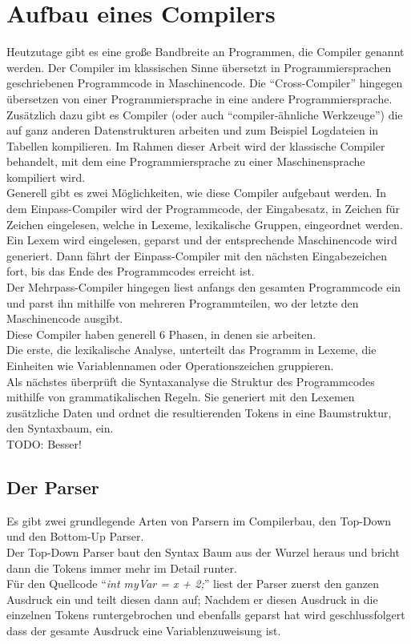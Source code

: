 \section{Aufbau eines Compilers}

Heutzutage gibt es eine große Bandbreite an Programmen, die Compiler genannt werden.
Der Compiler im klassischen Sinne übersetzt in Programmiersprachen geschriebenen Programmcode in Maschinencode.
Die ``Cross-Compiler'' hingegen übersetzen von einer Programmiersprache in eine andere Programmiersprache.
Zusätzlich dazu gibt es Compiler (oder auch ``compiler-ähnliche Werkzeuge'') die auf ganz anderen Datenstrukturen arbeiten und zum Beispiel Logdateien in Tabellen kompilieren.
Im Rahmen dieser Arbeit wird der klassische Compiler behandelt, mit dem eine Programmiersprache zu einer Maschinensprache kompiliert wird.\\
Generell gibt es zwei Möglichkeiten, wie diese Compiler aufgebaut werden.
In dem Einpass-Compiler wird der Programmcode, der Eingabesatz, in Zeichen für Zeichen eingelesen, welche in Lexeme, lexikalische Gruppen, eingeordnet werden.
Ein Lexem wird eingelesen, geparst und der entsprechende Maschinencode wird generiert.
Dann fährt der Einpass-Compiler mit den nächsten Eingabezeichen fort, bis das Ende des Programmcodes erreicht ist.\\
Der Mehrpass-Compiler hingegen liest anfangs den gesamten Programmcode ein und parst ihn mithilfe von mehreren Programmteilen, wo der letzte den Maschinencode ausgibt\cite{mossenbock:2024}.\\
Diese Compiler haben generell 6 Phasen, in denen sie arbeiten.\\
Die erste, die lexikalische Analyse, unterteilt das Programm in Lexeme, die Einheiten wie Variablennamen oder Operationszeichen gruppieren.\\
Als nächstes überprüft die Syntaxanalyse die Struktur des Programmcodes mithilfe von grammatikalischen Regeln.
Sie generiert mit den Lexemen zusätzliche Daten und ordnet die resultierenden Tokens in eine Baumstruktur, den Syntaxbaum, ein.\\

\textsf{TODO: Besser!}

\subsection{Der Parser}

Es gibt zwei grundlegende Arten von Parsern im Compilerbau, den Top-Down und den Bottom-Up Parser.\\
Der Top-Down Parser baut den Syntax Baum aus der Wurzel heraus und bricht dann die Tokens immer mehr im Detail runter.\\
Für den Quellcode ``\textit{int myVar = x + 2;}'' liest der Parser zuerst den ganzen Ausdruck ein und teilt diesen dann auf;
Nachdem er diesen Ausdruck in die einzelnen Tokens runtergebrochen und ebenfalls geparst hat wird geschlussfolgert dass der gesamte Ausdruck eine Variablenzuweisung ist.

